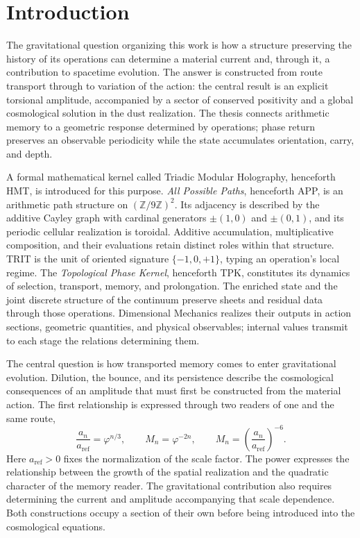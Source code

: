 \section{Introduction}
\label{vii:sec:introduccion}

The gravitational question organizing this work is how a structure
preserving the history of its operations can determine a material current
and, through it, a contribution to spacetime evolution. The answer is
constructed from route transport through to variation of the action:
the central result is an explicit torsional amplitude, accompanied by a
sector of conserved positivity and a global cosmological solution in the
dust realization. The thesis connects arithmetic memory to a geometric
response determined by operations; phase return preserves an observable
periodicity while the state accumulates orientation, carry, and depth.

A formal mathematical kernel called Triadic Modular Holography,
henceforth HMT, is introduced for this purpose. \emph{All Possible
Paths}, henceforth APP, is an arithmetic path structure on
\((\mathbb Z/9\mathbb Z)^2\). Its adjacency is described by the additive
Cayley graph with cardinal generators \(\pm(1,0)\) and \(\pm(0,1)\),
and its periodic cellular realization is toroidal. Additive
accumulation, multiplicative composition, and their evaluations retain
distinct roles within that structure. TRIT is the unit of oriented
signature \(\{-1,0,+1\}\), typing an operation's local regime. The
\emph{Topological Phase Kernel}, henceforth TPK, constitutes its dynamics
of selection, transport, memory, and prolongation. The enriched state and
the joint discrete structure of the continuum preserve sheets and
residual data through those operations. Dimensional Mechanics realizes
their outputs in action sections, geometric quantities, and physical
observables; internal values transmit to each stage the relations
determining them.

The central question is how transported memory comes to enter
gravitational evolution. Dilution, the bounce, and its persistence
describe the cosmological consequences of an amplitude that must first
be constructed from the material action. The first relationship is expressed
through two readers of one and the same route,
\begin{equation}
 \frac{a_n}{a_{\mathrm{ref}}}=\varphi^{n/3},
 \qquad M_n=\varphi^{-2n},
 \qquad
 M_n=\left(\frac{a_n}{a_{\mathrm{ref}}}\right)^{-6}.
 \label{vii:eq:programa-dilucion}
\end{equation}
Here \(a_{\mathrm{ref}}>0\) fixes the normalization of the scale factor.
The power expresses the relationship between the growth of the spatial
realization and the quadratic character of the memory reader. The gravitational
contribution also requires determining the current and amplitude accompanying
that scale dependence. Both constructions occupy a section of their own
before being introduced into the cosmological equations.

